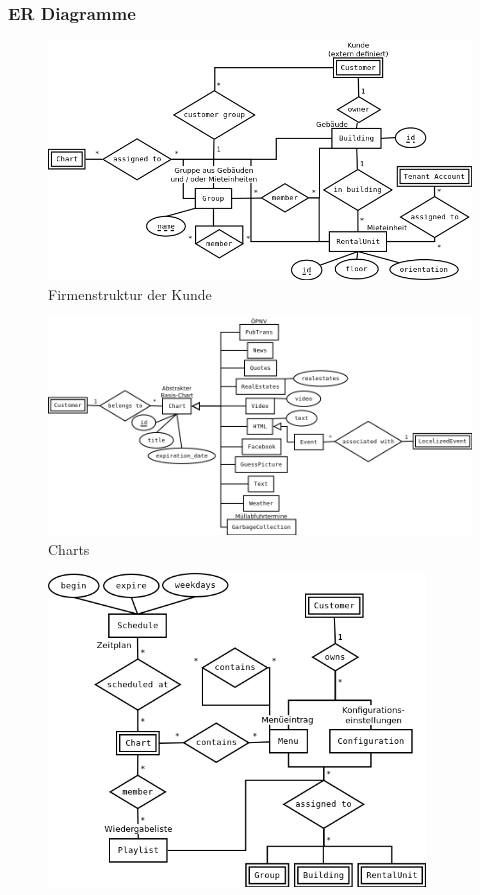\documentclass[a4paper]{article}
\begin{document}
	\subsubsection{ER Diagramme}
	\begin{center}
	\begin{figure}[h]
		\includegraphics[width=130mm]{company_structure.png}
		\caption{Firmenstruktur der Kunde}
	\end{figure}
	\begin{figure}[h]
		\includegraphics[width=130mm]{charts.png}
		\caption{Charts}
	\end{figure}
	\begin{figure}[h]
		\includegraphics[width=100mm]{presentation.png}

\end{figure}
\end{center}
\end{document}
